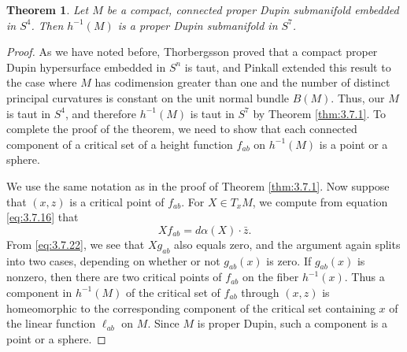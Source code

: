 \documentclass[12pt]{article}
\newtheorem{theorem}{Theorem}[section]
\begin{document}
\begin{theorem}
\label{thm:3.7.2} 
Let $M$ be a compact, connected proper Dupin
submanifold embedded in $S^4$.  Then $h^{-1}(M)$ is a proper Dupin
submanifold in $S^7$.
\end{theorem}
\begin{proof}
As we have noted before, Thorbergsson
\cite{Th1} proved that a compact proper Dupin hypersurface embedded in $S^n$
is taut, and Pinkall
\cite{P5} extended this result to the case where $M$ has codimension greater than one and the
number of distinct principal curvatures is constant on the unit normal 
bundle $B(M)$.  Thus, our $M$ is taut in
$S^4$, and therefore $h^{-1}(M)$ is taut in $S^7$ by Theorem \ref{thm:3.7.1}.  To complete the proof of the theorem,
we need to show that each connected component of a critical set of a height function $f_{ab}$ on $h^{-1}(M)$ is
a point or a sphere.

We use the same notation as in the proof of Theorem \ref{thm:3.7.1}.  Now suppose that $(x,z)$ is a critical point of
$f_{ab}$.  For $X \in T_xM$, we compute from equation \eqref{eq:3.7.16} that
\begin{equation} 
\label{eq:3.7.23}
Xf_{ab} = d\alpha (X) \cdot \bar{z}.
\end{equation}
From \eqref{eq:3.7.22}, we see that $Xg_{ab}$ also equals zero, and the argument again splits into two cases, depending
on whether or not $g_{ab}(x)$ is zero.  If $g_{ab}(x)$ is nonzero, then there are two critical points of 
$f_{ab}$ on the fiber $h^{-1}(x)$.  Thus a component in $h^{-1}(M)$ of the critical set of $f_{ab}$ through $(x,z)$
is homeomorphic to the corresponding component of the critical set containing $x$ of the linear function
$\ell_{ab}$ on $M$.  Since $M$ is proper Dupin, such a component is a point or a sphere.


\end{proof}
\end{document}

